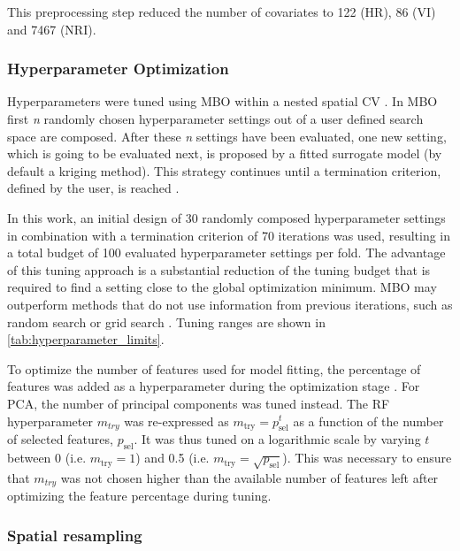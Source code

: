 \documentclass[peerreview]{IEEEtran}
\begin{document}
This preprocessing step reduced the number of covariates to 122 (HR), 86 (VI) and 7467 (NRI).

\subsubsection{Hyperparameter Optimization}

Hyperparameters were tuned using \ac{MBO} within a nested spatial \ac{CV} \cite{mlrmbo, binder2020, schratz2019}.
In MBO first \textit{n} randomly chosen hyperparameter settings out of a user defined search space are composed.
After these \textit{n} settings have been evaluated, one new setting, which is going to be evaluated next, is proposed by a fitted surrogate model (by default a kriging method).
This strategy continues until a termination criterion, defined by the user, is reached \cite{hutter2011, jones1998}.

In this work, an initial design of 30 randomly composed hyperparameter settings in combination with a termination criterion of 70 iterations was used, resulting in a total budget of 100 evaluated hyperparameter settings per fold.
The advantage of this tuning approach is a substantial reduction of the tuning budget that is required to find a setting close to the global optimization minimum.
\ac{MBO} may outperform methods that do not use information from previous iterations, such as random search or grid search \cite{bergstra2012}.
Tuning ranges are shown in \autoref{tab:hyperparameter_limits}.

To optimize the number of features used for model fitting, the percentage of features was added as a hyperparameter during the optimization stage \cite{binder2020}.
For \ac{PCA}, the number of principal components was tuned instead.
The RF hyperparameter \texttt{\(m_{try}\)} was re-expressed as $m_\textrm{try} = p_\textrm{sel}^t$ as a function of the number of selected features, $p_\textrm{sel}$.
It was thus tuned on a logarithmic scale by varying $t$ between 0 (i.e. $m_\textrm{try} = 1$) and 0.5 (i.e. $m_\textrm{try}=\sqrt{p_\textrm{sel}}$).
This was necessary to ensure that \texttt{\(m_{try}\)} was not chosen higher than the available number of features left after optimizing the feature percentage during tuning.

\subsubsection{Spatial resampling}
\end{document}
